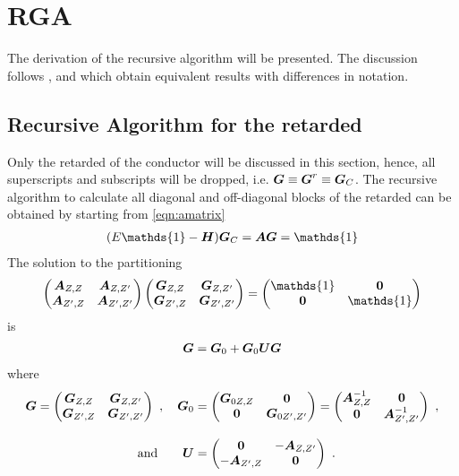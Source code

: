 \chapter{RGA}
\label{app:RGA}
The derivation of the recursive \gfnc{} algorithm will be presented. The discussion follows \cite{JApplPhys.91.2343}, \cite{JApplPhys.81.7845} and \cite{Wimmer2009Thesis} which obtain equivalent results with differences in notation.
\section{Recursive Algorithm for the retarded \gfnc{}}
Only the retarded \gfnc{} of the conductor will be discussed in this section, hence, all superscripts and subscripts will be dropped, i.e. $\boldsymbol{G} \equiv \boldsymbol{G}^r\equiv \boldsymbol{G}_C$. The recursive algorithm to calculate all diagonal and off-diagonal blocks of the retarded \gfnc{} can be obtained by starting from \cref{eqn:amatrix}
\begin{align}
  (E\mathds{1}-\mat{H})\mat{G}_C = \mat{A}\mat{G}=\mathds{1}
  \label{eqn:amatrixppendix}
  \end{align}
  The solution to the partitioning
  \begin{align}
  \begin{pmatrix} \mat{A}_{Z,Z} & \mat{A}_{Z,Z'}\\
		  \mat{A}_{Z',Z} & \mat{A}_{Z',Z'}
  \end{pmatrix}
  \begin{pmatrix} \mat{G}_{Z,Z} & \mat{G}_{Z,Z'}\\
		  \mat{G}_{Z',Z} & \mat{G}_{Z',Z'}
  \end{pmatrix} = 
  \begin{pmatrix} \mathds{1} & \mat{0}\\
		  \mat{0} & \mathds{1}
  \end{pmatrix}
\end{align}
is
\begin{align}
  \boldsymbol{G}=\boldsymbol{G}_0+\boldsymbol{G}_0\boldsymbol{U}\boldsymbol{G}
  \label{eqn:dysonequationappendix}
\end{align}
where 
\begin{align}
  \boldsymbol{G} = 
  \begin{pmatrix} \boldsymbol{G}_{Z,Z} & \boldsymbol{G}_{Z,Z'}\\
		  \boldsymbol{G}_{Z',Z} & \boldsymbol{G}_{Z',Z'}
  \end{pmatrix}\ ,\quad
  \boldsymbol{G}_0 &= 
  \begin{pmatrix} \boldsymbol{G}_{0 Z,Z} & \boldsymbol{0}\\
		  \boldsymbol{0} & \boldsymbol{G}_{0 Z',Z'}
  \end{pmatrix}=
  \begin{pmatrix} \boldsymbol{A}^{-1}_{Z,Z} & \boldsymbol{0}\\
		  \boldsymbol{0} & \boldsymbol{A}^{-1}_{Z',Z'}
  \end{pmatrix}\ ,\notag\\[3mm] 
  \text{and}\hspace{2em}
  \boldsymbol{U} &= 
  \begin{pmatrix} \boldsymbol{0} & -\boldsymbol{A}_{Z,Z'}\\
		  -\boldsymbol{A}_{Z',Z} & \boldsymbol{0}
  \end{pmatrix}\ .
\end{align}
